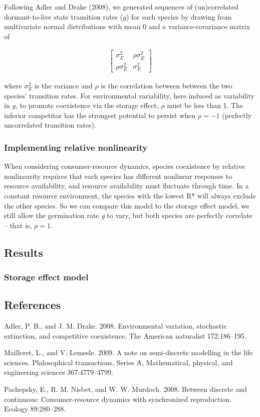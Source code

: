 \documentclass[12pt,]{article}
\begin{document}
Following Adler and Drake (2008), we generated sequences of
(un)correlated dormant-to-live state transition rates ($g$) for each
species by drawing from multivariate normal distributions with mean 0
and a variance-covariance matrix of

\begin{align}
\begin{bmatrix}
\sigma^2_{E} & \rho\sigma^2_{E} \\
\rho\sigma^2_{E} & \sigma^2_{E}
\end{bmatrix}
\end{align}

\noindent{}where $\sigma^2_{E}$ is the variance and $\rho$ is the
correlation between between the two species' transition rates. For
environmental variability, here induced as variability in $g$, to
promote coexistence via the storage effect, $\rho$ must be less than 1.
The inferior competitor has the strongest potential to persist when
$\rho=-1$ (perfectly uncorrelated transition rates).

\subsubsection{Implementing relative
nonlinearity}\label{implementing-relative-nonlinearity}

When considering consumer-resource dynamics, species coexistence by
relative nonlinearity requires that each species has different nonlinear
responses to resource availability, and resource availability must
fluctuate through time. In a constant resource environment, the species
with the lowest R* will always exclude the other species. So we can
compare this model to the storage effect model, we still allow the
germination rate \emph{g} to vary, but both species are perfectly
correlate -- that is, $\rho=1$.

\subsection{Results}\label{results}

\subsubsection{Storage effect model}\label{storage-effect-model}

\pagebreak{}

\subsection{References}\label{references}

Adler, P. B., and J. M. Drake. 2008. Environmental variation, stochastic
extinction, and competitive coexistence. The American naturalist
172:186--195.

Mailleret, L., and V. Lemesle. 2009. A note on semi-discrete modelling
in the life sciences. Philosophical transactions. Series A,
Mathematical, physical, and engineering sciences 367:4779--4799.

Pachepsky, E., R. M. Nisbet, and W. W. Murdoch. 2008. Between discrete
and continuous: Consumer-resource dynamics with synchronized
reproduction. Ecology 89:280--288.
\end{document}
